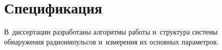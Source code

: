 \section{Спецификация}

В~диссертации разработаны алгоритмы работы и~структура системы обнаружения радиоимпульсов и~измерения их основных параметров. 
